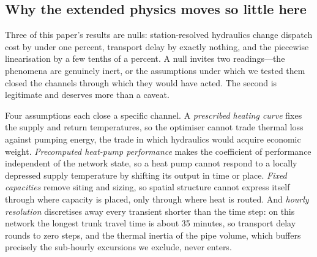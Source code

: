 
\subsection{Why the extended physics moves so little here}
\label{subsec:whynull}

Three of this paper's results are nulls: station-resolved hydraulics change dispatch cost
by under one percent, transport delay by exactly nothing, and the piecewise linearisation
by a few tenths of a percent. A null invites two readings---the phenomena are genuinely
inert, or the assumptions under which we tested them closed the channels through which they
would have acted. The second is legitimate and deserves more than a caveat.

Four assumptions each close a specific channel. A \emph{prescribed heating curve} fixes the
supply and return temperatures, so the optimiser cannot trade thermal loss against pumping
energy, the trade in which hydraulics would acquire economic weight. \emph{Precomputed
heat-pump performance} makes the coefficient of performance independent of the network
state, so a heat pump cannot respond to a locally depressed supply temperature by shifting
its output in time or place. \emph{Fixed capacities} remove siting and sizing, so spatial
structure cannot express itself through where capacity is placed, only through where heat
is routed. And \emph{hourly resolution} discretises away every transient shorter than the
time step: on this network the longest trunk travel time is about 35 minutes, so transport
delay rounds to zero steps, and the thermal inertia of the pipe volume, which buffers
precisely the sub-hourly excursions we exclude, never enters.

